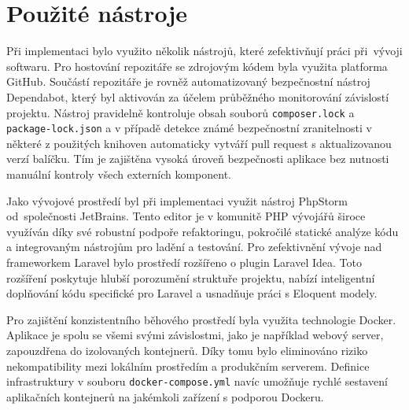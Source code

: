 \section{Použité nástroje}
Při implementaci bylo využito několik nástrojů, které zefektivňují práci při~vývoji softwaru. Pro hostování repozitáře se zdrojovým kódem byla využita platforma GitHub. Součástí repozitáře je rovněž automatizovaný bezpečnostní nástroj Dependabot, který byl aktivován za účelem průběžného monitorování závislostí projektu. Nástroj pravidelně kontroluje obsah souborů \texttt{composer.lock} a \texttt{package-lock.json} a v případě detekce známé bezpečnostní zranitelnosti v některé z použitých knihoven automaticky vytváří pull request s aktualizovanou verzí balíčku. Tím je zajištěna vysoká úroveň bezpečnosti aplikace bez nutnosti manuální kontroly všech externích komponent.

Jako vývojové prostředí byl při implementaci využit nástroj PhpStorm od~společnosti JetBrains. Tento editor je v komunitě PHP vývojářů široce využíván díky své robustní podpoře refaktoringu, pokročilé statické analýze kódu a integrovaným nástrojům pro ladění a testování. \cite{php-jetbrains} Pro zefektivnění vývoje nad frameworkem Laravel bylo prostředí rozšířeno o plugin Laravel Idea. Toto rozšíření poskytuje hlubší porozumění struktuře projektu, nabízí inteligentní doplňování kódu specifické pro Laravel a usnadňuje práci s Eloquent modely.

Pro zajištění konzistentního běhového prostředí byla využita technologie Docker. Aplikace je spolu se všemi svými závislostmi, jako je například webový server, zapouzdřena do izolovaných kontejnerů. Díky tomu bylo eliminováno riziko nekompatibility mezi lokálním prostředím a produkčním serverem. Definice infrastruktury v souboru \texttt{docker-compose.yml} navíc umožňuje rychlé sestavení aplikačních kontejnerů na jakémkoli zařízení s podporou Dockeru.
